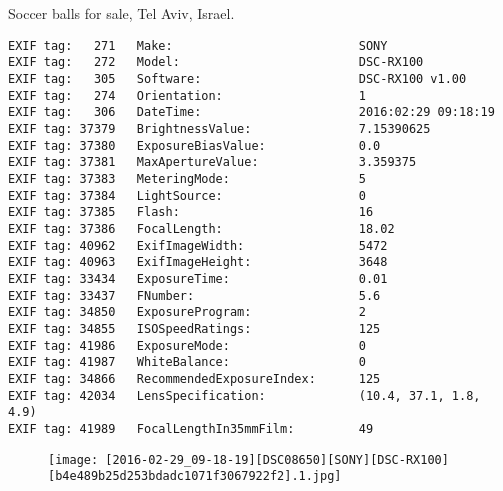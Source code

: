 \section{\protect{}}
\noindent Soccer balls for sale, Tel Aviv, Israel.
\noindent
\begin{lstlisting}
EXIF tag:   271   Make:                          SONY
EXIF tag:   272   Model:                         DSC-RX100
EXIF tag:   305   Software:                      DSC-RX100 v1.00
EXIF tag:   274   Orientation:                   1
EXIF tag:   306   DateTime:                      2016:02:29 09:18:19
EXIF tag: 37379   BrightnessValue:               7.15390625
EXIF tag: 37380   ExposureBiasValue:             0.0
EXIF tag: 37381   MaxApertureValue:              3.359375
EXIF tag: 37383   MeteringMode:                  5
EXIF tag: 37384   LightSource:                   0
EXIF tag: 37385   Flash:                         16
EXIF tag: 37386   FocalLength:                   18.02
EXIF tag: 40962   ExifImageWidth:                5472
EXIF tag: 40963   ExifImageHeight:               3648
EXIF tag: 33434   ExposureTime:                  0.01
EXIF tag: 33437   FNumber:                       5.6
EXIF tag: 34850   ExposureProgram:               2
EXIF tag: 34855   ISOSpeedRatings:               125
EXIF tag: 41986   ExposureMode:                  0
EXIF tag: 41987   WhiteBalance:                  0
EXIF tag: 34866   RecommendedExposureIndex:      125
EXIF tag: 42034   LensSpecification:             (10.4, 37.1, 1.8, 4.9)
EXIF tag: 41989   FocalLengthIn35mmFilm:         49

\end{lstlisting}
\clearpage
\begin{figure}
\raggedleft
\texttt{[image: [2016-02-29\_09-18-19][DSC08650][SONY][DSC-RX100][b4e489b25d253bdadc1071f3067922f2].1.jpg]}
\end{figure}


\clearpage
